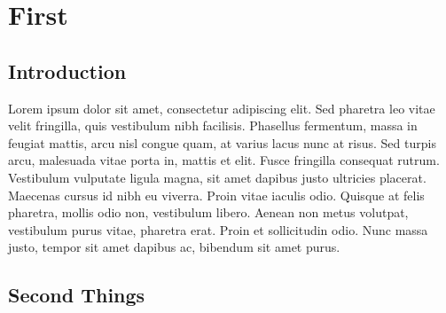\documentclass[main.tex]{subfiles}
\begin{document}
\chapter{First}

\section{Introduction}
Lorem ipsum dolor sit amet, consectetur adipiscing elit. Sed pharetra leo vitae velit fringilla, quis vestibulum nibh facilisis. Phasellus fermentum, massa in feugiat mattis, arcu nisl congue quam, at varius lacus nunc at risus. Sed turpis arcu, malesuada vitae porta in, mattis et elit. Fusce fringilla consequat rutrum. Vestibulum vulputate ligula magna, sit amet dapibus justo ultricies placerat. Maecenas cursus id nibh eu viverra. Proin vitae iaculis odio. Quisque at felis pharetra, mollis odio non, vestibulum libero. Aenean non metus volutpat, vestibulum purus vitae, pharetra erat. Proin et sollicitudin odio. Nunc massa justo, tempor sit amet dapibus ac, bibendum sit amet purus.\cite{mrx05}

\section{Second Things}
\end{document}
